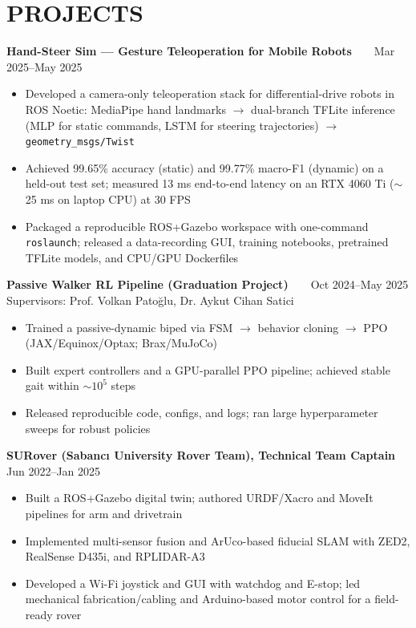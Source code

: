 \section*{PROJECTS}

\textbf{Hand-Steer Sim --- Gesture Teleoperation for Mobile Robots} \textbar\  \textbar\  \hfill Mar 2025--May 2025
\begin{itemize}
  \item Developed a camera-only teleoperation stack for differential-drive robots in ROS Noetic: MediaPipe hand landmarks $\rightarrow$ dual-branch TFLite inference (MLP for static commands, LSTM for steering trajectories) $\rightarrow$ \texttt{geometry\_msgs/Twist}
  \item Achieved 99.65\% accuracy (static) and 99.77\% macro-F1 (dynamic) on a held-out test set; measured 13 ms end-to-end latency on an RTX 4060 Ti ($\sim$25 ms on laptop CPU) at 30 FPS
  \item Packaged a reproducible ROS+Gazebo workspace with one-command \texttt{roslaunch}; released a data-recording GUI, training notebooks, pretrained TFLite models, and CPU/GPU Dockerfiles
\end{itemize}
\entrysep

\textbf{Passive Walker RL Pipeline (Graduation Project)} \textbar\  \textbar\  \hfill Oct 2024--May 2025\\
Supervisors: Prof. Volkan Patoğlu, Dr. Aykut Cihan Satici
\begin{itemize}
  \item Trained a passive-dynamic biped via FSM $\rightarrow$ behavior cloning $\rightarrow$ PPO (JAX/Equinox/Optax; Brax/MuJoCo)
  \item Built expert controllers and a GPU-parallel PPO pipeline; achieved stable gait within $\sim 10^5$ steps
  \item Released reproducible code, configs, and logs; ran large hyperparameter sweeps for robust policies
\end{itemize}
\entrysep

\textbf{SURover (Sabancı University Rover Team), Technical Team Captain} \hfill Jun 2022--Jan 2025
\begin{itemize}
  \item Built a ROS+Gazebo digital twin; authored URDF/Xacro and MoveIt pipelines for arm and drivetrain
  \item Implemented multi-sensor fusion and ArUco-based fiducial SLAM with ZED2, RealSense D435i, and RPLIDAR-A3
  \item Developed a Wi-Fi joystick and GUI with watchdog and E-stop; led mechanical fabrication/cabling and Arduino-based motor control for a field-ready rover
\end{itemize}
\entrysep

